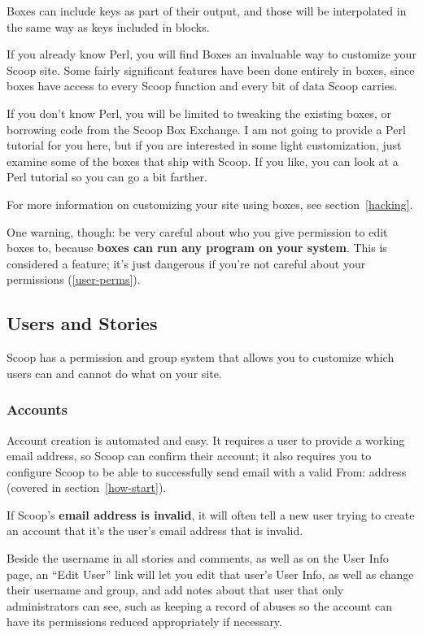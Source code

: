 Boxes can include keys as part of their output, and those will be interpolated in the same way as keys included in blocks.

If you already know Perl, you will find Boxes an invaluable way to customize your Scoop site.  Some fairly significant features have been done entirely in boxes, since boxes have access to every Scoop function and every bit of data Scoop carries.

If you don't know Perl, you will be limited to tweaking the existing boxes, or borrowing code from the Scoop Box Exchange.  I am not going to provide a Perl tutorial for you here, but if you are interested in some light customization, just examine some of the boxes that ship with Scoop. If you like, you can look at a Perl tutorial so you can go a bit farther.

For more information on customizing your site using boxes, see section~\ref{hacking}.

One warning, though: be very careful about who you give permission to edit boxes to, because {\bf boxes can run any program on your system}.  This is considered a feature; it's just dangerous if you're not careful about your permissions (\ref{user-perms}).

\subsection{Users and Stories}
\label{admin-users}

Scoop has a permission and group system that allows you to customize which users can and cannot do what on your site.

\subsubsection{Accounts}

Account creation is automated and easy.  It requires a user to provide a working email address, so Scoop can confirm their account; it also requires you to configure Scoop to be able to successfully send email with a valid From: address (covered in section~\ref{how-start}).

If Scoop's {\bf email address is invalid}, it will often tell a new user trying to create an account that it's the user's email address that is invalid.

Beside the username in all stories and comments, as well as on the User Info page, an ``Edit User'' link will let you edit that user's User Info, as well as change their username and group, and add notes about that user that only administrators can see, such as keeping a record of abuses so the account can have its permissions reduced appropriately if necessary.

